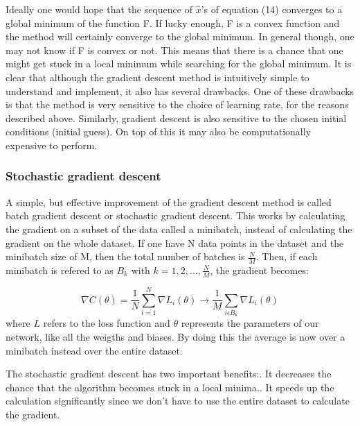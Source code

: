 \documentclass[a4paper,12pt]{article}
\begin{document}
Ideally one would hope that the sequence of $\hat{x}$'s of equation (14) converges to a global minimum of the function F. If lucky enough, F is a convex function and the method will certainly converge to the global minimum.\newline 
In general though, one may not know if F is convex or not. This means that there is a chance that one might get stuck in a local minimum while searching for the global minimum. It is clear that although the gradient descent method is intuitively simple to understand and implement, it also has several drawbacks.\newline
One of these drawbacks is that the method is very sensitive to the choice of learning rate, for the reasons described above. Similarly, gradient descent is also sensitive to the chosen initial conditions (initial guess). On top of this it may also be computationally expensive to perform.

\subsubsection{Stochastic gradient descent}
A simple, but effective improvement of the gradient descent method is called batch gradient descent or stochastic gradient descent. This works by calculating the gradient on a subset of the data called a minibatch, instead of calculating the gradient on the whole dataset. If one have N data points in the dataset and the minibatch size of M, then the total number of batches is $\frac{N}{M}$. Then, if each minibatch is refered to as $B_k$ with $k = 1, 2,..., \frac{N}{M}$, the gradient becomes:

\begin{equation}
    \nabla C(\theta) = \frac{1}{N} \sum_{i=1}^N{\nabla L_i (\theta)} \rightarrow \frac{1}{M} \sum_{i \epsilon B_k} \nabla L_i(\theta)
\end{equation}
where $L$ refers to the loss function and $\theta$ represents the parameters of our network, like all the weigths and biases. By doing this the average is now over a minibatch instead over the entire dataset.\newline

The stochastic gradient descent has two important benefits:. It decreases the chance that the algorithm becomes stuck in a local minima.. It speeds up the calculation significantly since we don't have to use the entire dataset to calculate the gradient.\newline
\end{document}
